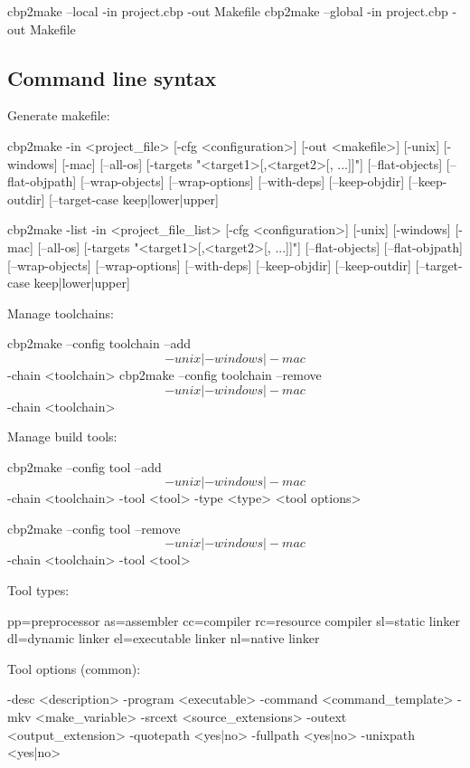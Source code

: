 \begin{code}
cbp2make -in project.cbp -out Makefile}
\end{code}


\begin{code}
cbp2make --local -in project.cbp -out Makefile
cbp2make --global -in project.cbp -out Makefile
\end{code}

\subsection{Command line syntax}

Generate makefile:
\begin{code}
cbp2make -in <project_file> [-cfg <configuration>] [-out <makefile>]
[-unix] [-windows] [-mac] [--all-os] [-targets "<target1>[,<target2>[, ...]]"]
[--flat-objects] [--flat-objpath] [--wrap-objects] [--wrap-options]
[--with-deps] [--keep-objdir] [--keep-outdir] [--target-case keep|lower|upper]

cbp2make -list -in <project_file_list> [-cfg <configuration>]
[-unix] [-windows] [-mac] [--all-os] [-targets "<target1>[,<target2>[, ...]]"]
[--flat-objects] [--flat-objpath] [--wrap-objects] [--wrap-options]
[--with-deps] [--keep-objdir] [--keep-outdir] [--target-case keep|lower|upper]
\end{code}

Manage toolchains:
\begin{code}
cbp2make --config toolchain --add \[-unix|-windows|-mac\] -chain <toolchain>
cbp2make --config toolchain --remove \[-unix|-windows|-mac\] -chain <toolchain>
\end{code}

Manage build tools:
\begin{code}
cbp2make --config tool --add \[-unix|-windows|-mac\] -chain <toolchain>
         -tool <tool> -type <type> <tool options>
         
cbp2make --config tool --remove \[-unix|-windows|-mac\] -chain <toolchain>
         -tool <tool>
\end{code}

Tool types:      
\begin{code}
    pp=preprocessor as=assembler cc=compiler rc=resource compiler
    sl=static linker dl=dynamic linker el=executable linker
    nl=native linker
\end{code}

Tool options (common):
\begin{code}
    -desc <description> -program <executable> -command <command_template>
    -mkv <make_variable> -srcext <source_extensions> -outext <output_extension>
    -quotepath <yes|no> -fullpath <yes|no> -unixpath <yes|no>
\end{code}

